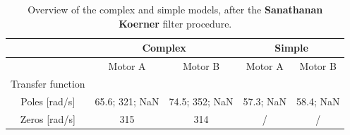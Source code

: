 \documentclass[a4paper,kul]{kulakarticle} %
\begin{document}
\begin{table}[htp]
	\centering
	\caption[Overview of the complex and simple models, after the Sanathanan Koerner filter]{Overview of the complex and simple models, after the \textbf{Sanathanan Koerner} filter procedure.}
	\label{tab:overview_SK}
	\bgroup
	\def\arraystretch{1.8}
	\begin{tabular}{|c||cc||cc|}
		\hline & \multicolumn{2}{c||}{\textbf{Complex}} & \multicolumn{2}{c|}{\textbf{Simple}} 
		\\ \hline \hline
		& \multicolumn{1}{c|}{Motor A} & Motor B & \multicolumn{1}{c|}{Motor A} & Motor B
		\\ \hline
		Transfer function & \multicolumn{1}{c|}{\scalebox{1.15}{$\frac{0.7124\text{ }z + 0.8249}{z^3 - 0.004181\text{ }z^2 - 0.2714\text{ }z}$}} & \scalebox{1.15}{$\frac{0.6884\text{ }z + 0.636}{z^3 - 0.2687\text{ }z^2 - 0.09782\text{ }z}$} & \multicolumn{1}{c|}{\scalebox{1.15}{$\frac{ 0.9158}{z^2 - 0.5636\text{ }z}$}} & \scalebox{1.15}{$\frac{0.9249}{z^2 - 0.5578\text{ }z}$} 
		\\ \hline
		Poles [rad/s] & \multicolumn{1}{c|}{65.6; 321; NaN} & 74.5; 352; NaN & \multicolumn{1}{c|}{57.3; NaN} & 58.4; NaN
		\\ \hline
		Zeros [rad/s] & \multicolumn{1}{c|}{315} & 314 & \multicolumn{1}{c|}{/} & /
		\\ \hline
	\end{tabular}
	\egroup
\end{table}


\newpage
\end{document}
